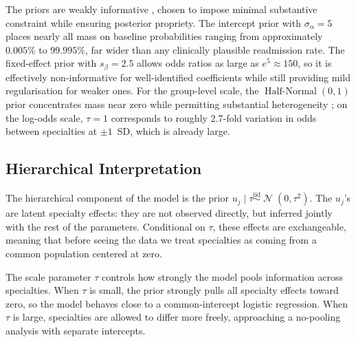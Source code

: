 \documentclass[10pt]{article}
\newcommand{\iid}{\overset{\text{iid}}{\sim}}
\DeclareMathOperator{\Normal}{\mathcal{N}}
\DeclareMathOperator{\HalfNormal}{Half\text{-}Normal}
\begin{document}
The priors are weakly informative \citep{gelman2013bda}, chosen to impose
minimal substantive constraint while ensuring posterior propriety. The
intercept prior with $\sigma_\alpha = 5$ places nearly all mass on baseline
probabilities ranging from approximately $0.005\%$ to $99.995\%$, far wider
than any clinically plausible readmission rate. The fixed-effect prior with
$s_\beta = 2.5$ allows odds ratios as large as $e^5 \approx 150$, so it is
effectively non-informative for well-identified coefficients while still
providing mild regularisation for weaker ones. For the group-level scale, the
$\HalfNormal(0,1)$ prior concentrates mass near zero while permitting
substantial heterogeneity \citep{gelman2006prior}; on the log-odds scale,
$\tau = 1$ corresponds to roughly 2.7-fold variation in odds between
specialties at $\pm 1$~SD, which is already large.

\subsection{Hierarchical Interpretation}

The hierarchical component of the model is the prior
$u_j \mid \tau \iid \Normal(0, \tau^2)$.  The $u_j$'s are latent
specialty effects: they are not observed directly, but inferred jointly with
the rest of the parameters.  Conditional on $\tau$, these effects are
exchangeable, meaning that before seeing the data we treat specialties as
coming from a common population centered at zero.

The scale parameter $\tau$ controls how strongly the model pools information
across specialties.  When $\tau$ is small, the prior strongly pulls all
specialty effects toward zero, so the model behaves close to a common-intercept
logistic regression.  When $\tau$ is large, specialties are allowed to differ
more freely, approaching a no-pooling analysis with separate intercepts.
\end{document}
